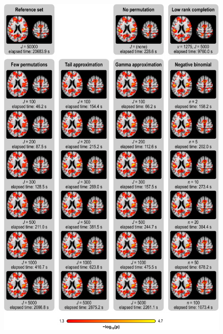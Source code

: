 \begin{figure}[!tp]
\centering
\includegraphics[scale=.9]{figures/vbm-vox-uncp.pdf}
\label{fig:vbm-vox-uncp_noref}
\end{figure}

